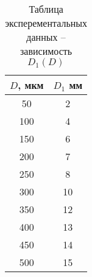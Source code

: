 \begin{table}[h!]
    \centering
    \begin{tabular}{|c|c|}
        \hline
        $D$, мкм & $D_1$ мм \\ \hline
        50       & 2         \\ \hline
        100      & 4         \\ \hline
        150      & 6         \\ \hline
        200      & 7         \\ \hline
        250      & 8         \\ \hline
        300      & 10        \\ \hline
        350      & 12        \\ \hline
        400      & 13        \\ \hline
        450      & 14        \\ \hline
        500      & 15        \\ \hline
    \end{tabular}
	\caption{Таблица эксперементальных данных -- зависимость $D_1(D)$}
	\label{table:table_1}
\end{table}